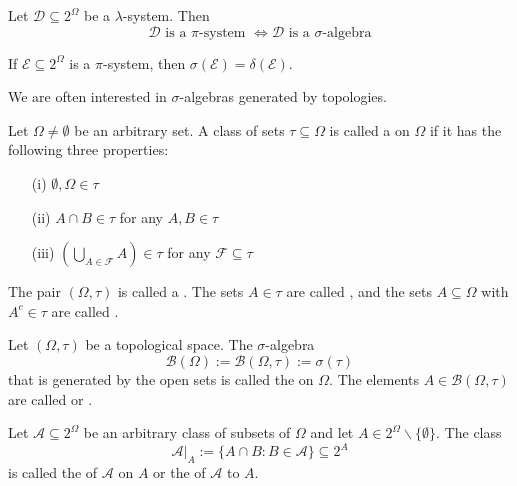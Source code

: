\documentclass[12pt, a4paper, oneside, openright, titlepage]{book}
\begin{document}
\begin{thm}
    Let $\mathcal{D}\subseteq 2^{\Omega}$ be a $\lambda$-system. Then \begin{equation*}
        \mathcal{D}\text{ is a $\pi$-system } \iff \mathcal{D} \text{ is a $\sigma$-algebra}
    \end{equation*}
\end{thm}

\begin{namthm}
    If $\mathcal{E} \subseteq 2^{\Omega}$ is a $\pi$-system, then $\sigma(\mathcal{E}) = \delta(\mathcal{E})$.
\end{namthm}

We are often interested in $\sigma$-algebras generated by topologies. 

\begin{defn}
    Let $\Omega \neq \emptyset$ be an arbitrary set. A class of sets $\tau \subseteq \Omega$ is called a  on $\Omega$ if it has the following three properties:  \begin{itemize}
        \item[(i)] $\emptyset, \Omega \in \tau$ 
        \item[(ii)] $A\cap B \in \tau$ for any $A,B\in \tau$
        \item[(iii)] $\left(\bigcup_{A\in\mathcal{F}}A\right)\in\tau$ for any $\mathcal{F}\subseteq \tau$
    \end{itemize}
    The pair $(\Omega,\tau)$ is called a . The sets $A \in \tau$ are called , and the sets $A \subseteq \Omega$ with $A^c \in \tau$ are called .
\end{defn}

\begin{defn}
    Let $(\Omega,\tau)$ be a topological space. The $\sigma$-algebra \begin{equation*}
        \mathcal{B}(\Omega) := \mathcal{B}(\Omega,\tau) := \sigma(\tau)
    \end{equation*}
    that is generated by the open sets is called the  on $\Omega$. The elements $A \in \mathcal{B}(\Omega,\tau)$ are called  or .
\end{defn}

\begin{defn}
    Let $\mathcal{A} \subseteq 2^{\Omega}$ be an arbitrary class of subsets of $\Omega$ and let $A \in 2^{\Omega}\backslash\{\emptyset\}$. The class \begin{equation*}
        \mathcal{A}\vert_A := \{A\cap B:B \in \mathcal{A}\}\subseteq 2^A
    \end{equation*}
    is called the  of $\mathcal{A}$ on $A$ or the  of $\mathcal{A}$ to $A$.
\end{defn}
\end{document}
